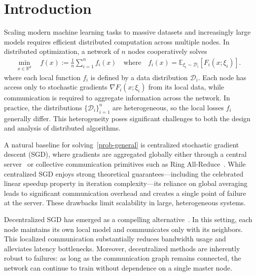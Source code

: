 \documentclass[10pt]{article}
\newenvironment{keywords}{\smallskip\noindent\textbf{Key words.} }{\par}
\begin{document}

\section{Introduction}
Scaling modern machine learning tasks to massive datasets and increasingly large models requires efficient distributed computation across multiple nodes. In distributed optimization, a network of $n$ nodes cooperatively solves  
\begin{align}\label{prob-general}
\min_{x\in \mathbb{R}^d}\quad f(x) := \frac{1}{n}\sum_{i=1}^n f_i(x) \quad \mbox{where} \quad f_i(x) = \mathbb{E}_{\xi_i \sim \mathcal{D}_i}[F_i(x; \xi_i)].
\end{align}
where each local function $f_i$ is defined by a data distribution $\mathcal{D}_i$. Each node has access only to stochastic gradients $\nabla F_i(x;\xi_i)$ from its local data, while communication is required to aggregate information across the network. In practice, the distributions $\{\mathcal{D}_i\}_{i=1}^n$ are heterogeneous, so the local losses $f_i$ generally differ. This heterogeneity poses significant challenges to both the design and analysis of distributed algorithms.  

A natural baseline for solving~\eqref{prob-general} is centralized stochastic gradient descent (SGD), where gradients are aggregated globally either through a central server~\cite{li2014scaling} or collective communication primitives such as Ring All-Reduce~\cite{patarasuk2009bandwidth}. While centralized SGD enjoys strong theoretical guarantees---including the celebrated linear speedup property in iteration complexity---its reliance on global averaging leads to significant communication overhead and creates a single point of failure at the server. These drawbacks limit scalability in large, heterogeneous systems.  

Decentralized SGD has emerged as a compelling alternative~\cite{chen2012diffusion,nedic2009distributed}. In this setting, each node maintains its own local model and communicates only with its neighbors. This localized communication substantially reduces bandwidth usage and alleviates latency bottlenecks. Moreover, decentralized methods are inherently robust to failures: as long as the communication graph remains connected, the network can continue to train without dependence on a single master node.  
\end{document}

